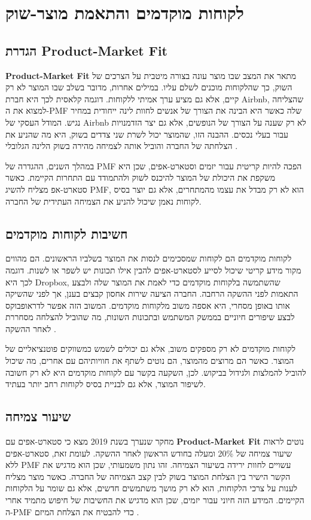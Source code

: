 \chapter{לקוחות מוקדמים והתאמת מוצר-שוק \texorpdfstring{}{(Product–Market Fit)}}

\section{הגדרת Product-Market Fit}
\textbf{Product-Market Fit}  מתאר את המצב שבו מוצר עונה בצורה מיטבית על הצרכים של השוק, כך שהלקוחות מוכנים לשלם עליו. במילים אחרות, מדובר בשלב שבו המוצר לא רק קיים, אלא גם מציע ערך אמיתי ללקוחות. דוגמה קלאסית לכך היא חברת Airbnb, שהצליחה למצוא את ה-PMF שלה כאשר היא הבינה את הצורך של אנשים לחוות לינה ייחודית במחיר נגיש. המודל העסקי של Airbnb לא רק שענה על הצורך של הנופשים, אלא גם יצר הזדמנויות עבור בעלי נכסים. ההבנה הזו, שהמוצר יכול לשרת שני צדדים בשוק, היא מה שהניע את הצלחתה של החברה והוביל אותה לצמיחה מהירה בשוק הלינה הגלובלי \cite{blank2013startup}.

במהלך השנים, ההגדרה של PMF הפכה להיות קריטית עבור יזמים וסטארט-אפים, שכן היא משקפת את היכולת של המוצר להיכנס לשוק ולהתמודד עם התחרות הקיימת. כאשר סטארט-אפ מצליח להשיג PMF, הוא לא רק מבדל את עצמו מהמתחרים, אלא גם יוצר בסיס לקוחות נאמן שיכול להניע את הצמיחה העתידית של החברה.

\section{חשיבות לקוחות מוקדמים}
לקוחות מוקדמים הם לקוחות שמסכימים לנסות את המוצר בשלביו הראשונים. הם מהווים מקור מידע קריטי שיכול לסייע לסטארט-אפים להבין אילו תכונות יש לשפר או לשנות. דוגמה לכך היא Dropbox, שהשתמשה בלקוחות מוקדמים כדי לאמת את המוצר שלה ולבצע התאמות לפני ההשקה הרחבה. החברה הציעה שירות אחסון קבצים בענן, אך לפני שהשיקה אותו באופן מסחרי, היא אספה משוב מלקוחות מוקדמים. המשוב הזה אפשר לדראופבוקס לבצע שיפורים חיוניים בממשק המשתמש ובתכונות השונות, מה שהוביל להצלחה מסחררת לאחר ההשקה \cite{ries2011lean}.

לקוחות מוקדמים לא רק מספקים משוב, אלא גם יכולים לשמש כמשווקים פוטנציאליים של המוצר. כאשר הם מרוצים מהמוצר, הם נוטים לשתף את חוויותיהם עם אחרים, מה שיכול להוביל להמלצות ולגידול בביקוש. לכן, השקעה בקשר עם לקוחות מוקדמים היא לא רק חשובה לשיפור המוצר, אלא גם לבניית בסיס לקוחות רחב יותר בעתיד.

\section{שיעור צמיחה}
מחקר שנערך בשנת 2019 מצא כי סטארט-אפים עם \textbf{Product-Market Fit} נוטים לראות שיעור צמיחה של 20\% ומעלה בחודש הראשון לאחר ההשקה. לעומת זאת, סטארט-אפים ללא PMF עשויים לחוות ירידה בשיעור הצמיחה. זהו נתון משמעותי, שכן הוא מדגיש את הקשר הישיר בין הצלחת המוצר בשוק לבין קצב הצמיחה של החברה. כאשר מוצר מצליח לענות על צרכי הלקוחות, הוא לא רק מושך משתמשים חדשים, אלא גם שומר על הלקוחות הקיימים. המידע הזה חיוני עבור יזמים, שכן הוא מדגיש את החשיבות של חיפוש מתמיד אחרי ה-PMF כדי להבטיח את הצלחת המיזם \cite{andreessen2007product}.


